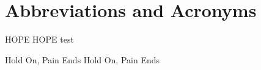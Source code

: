 \chapter{Abbreviations and Acronyms}\label{chapter:abbreviations}

\begin{multicols}{2}
\setlength{\parindent}{0pt}
	HOPE 
	\hfill \break 
	HOPE  test

\columnbreak
 
	Hold On, Pain Ends
 	\hfill \break
	Hold On, Pain Ends

\end{multicols}